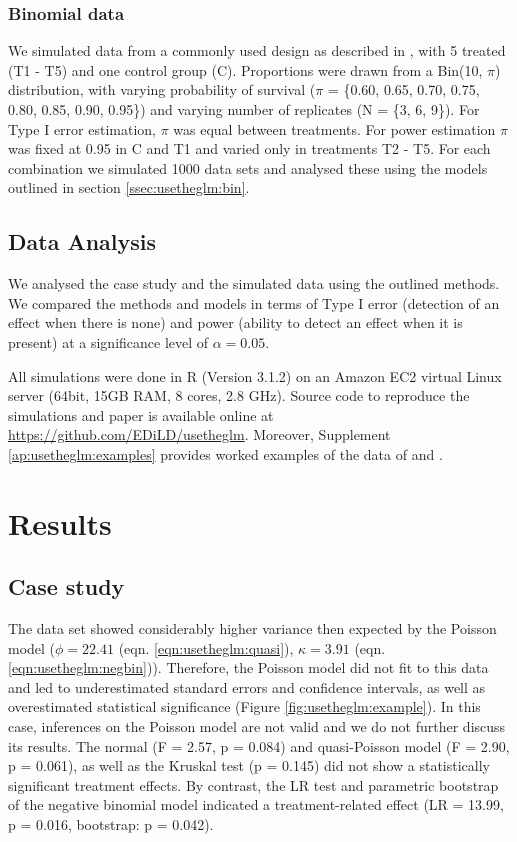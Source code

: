 \subsubsection{Binomial data}
We simulated data from a commonly used design as described in \citet{weber_short-term_1989}, with 5 treated (T1 - T5) and one control group (C). 
Proportions were drawn from a Bin(10, $\pi$) distribution, with varying probability of survival ($\pi$ = \{0.60, 0.65, 0.70, 0.75, 0.80, 0.85, 0.90, 0.95\}) and varying number of replicates (N = \{3, 6, 9\}).
For Type I error estimation, $\pi$ was equal between treatments.
For power estimation $\pi$ was fixed at 0.95  in C and T1 and varied only in treatments T2 - T5. 
For each combination we simulated 1000 data sets and analysed these using the models outlined in section \ref{ssec:usetheglm:bin}.


\subsection{Data Analysis}
\label{ssec:usetheglm:analysis}
We analysed the case study and the simulated data using the outlined methods.
We compared the methods and models in terms of Type I error (detection of an effect when there is none) and power (ability to detect an effect when it is present) at a significance level of $\alpha = 0.05$.

All simulations were done in R (Version 3.1.2) \citep{r_core_team_r:_2014} on an Amazon EC2 virtual Linux server (64bit, 15GB RAM, 8 cores, 2.8 GHz).
Source code to reproduce the simulations and paper is available online at \url{https://github.com/EDiLD/usetheglm}.
Moreover, Supplement \ref{ap:usetheglm:examples} provides worked examples of the data of \citet{brock_minimum_2015} and \citet{weber_short-term_1989}.


\section{Results}
\label{sec:usetheglm:results}
\subsection{Case study}
The data set showed considerably higher variance then expected by the Poisson model ($\phi = 22.41$ (eqn. \ref{eqn:usetheglm:quasi}), $\kappa = 3.91$ (eqn. \ref{eqn:usetheglm:negbin})). 
Therefore, the Poisson model did not fit to this data and led to underestimated standard errors and confidence intervals, as well as overestimated statistical significance (Figure \ref{fig:usetheglm:example}).
In this case, inferences on the Poisson model are not valid and we do not further discuss its results.
The normal (F = 2.57, p = 0.084) and quasi-Poisson model (F = 2.90, p = 0.061), as well as the Kruskal test (p =  0.145) did not show a statistically significant treatment effects.
By contrast, the LR test and parametric bootstrap of the negative binomial model indicated a treatment-related effect (LR = 13.99, p = 0.016, bootstrap: p = 0.042).

